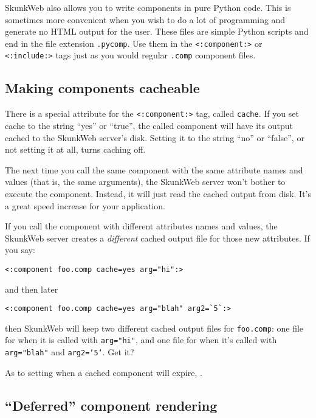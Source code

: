 \documentclass{manual}
\begin{document}
SkunkWeb also allows you to write components in pure Python
code. This is sometimes more convenient when you wish to do a lot
of programming and generate no HTML output for the user. These files
are simple Python scripts and end in the file extension \texttt{.pycomp}.
Use them in the \texttt{<:component:>} or
\texttt{<:include:>} 
tags just as you would regular \texttt{.comp} component files.


\subsection{Making components cacheable}
\label{tagcomponentcaching}

There is a special attribute for the \texttt{<:component:>} 
tag, called \texttt{cache}. If you set cache to the string ``yes''
or ``true'', the called component will have its output cached 
to the SkunkWeb server's disk. Setting it to the string ``no'' or
``false'', or not setting it at all, turns caching off.

The next time you call the same component with the same attribute
names and values (that is, the same arguments), the SkunkWeb server
won't bother to execute the component. Instead, it will just read the
cached output from disk. It's a great speed increase for your
application.

If you call the component with different attributes names and values,
the SkunkWeb server creates a \emph{different} cached output file for
those new attributes. If you say:

\begin{verbatim}<:component foo.comp cache=yes arg="hi":>
\end{verbatim}

and then later

\begin{verbatim}<:component foo.comp cache=yes arg="blah" arg2=`5`:>
\end{verbatim}

then SkunkWeb will keep two different cached output files 
for \texttt{foo.comp}: one file for when it
is called with \texttt{arg="hi"}, and one file for when 
it's called with \texttt{arg="blah"} and \texttt{arg2=`5`}. Get it?

As to setting when a cached component will expire, .

\subsection{``Deferred'' component rendering}
\end{document}

